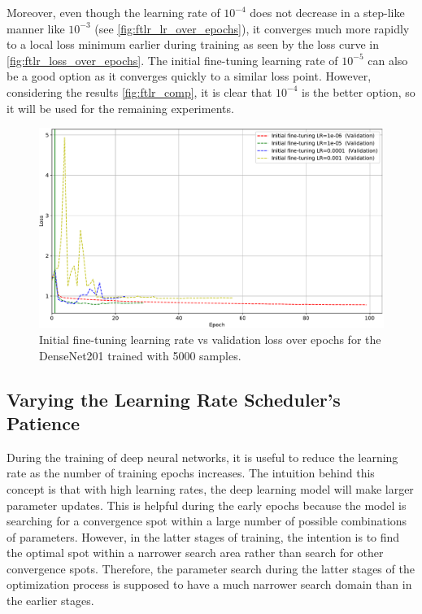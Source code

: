     Moreover, even though the learning rate of $10^{-4}$ does not decrease in a step-like manner like $10^{-3}$ (see \autoref{fig:ftlr_lr_over_epochs}), it converges much more rapidly to a local loss minimum earlier during training as seen by the loss curve in \autoref{fig:ftlr_loss_over_epochs}. The initial fine-tuning learning rate of $10^{-5}$ can also be a good option as it converges quickly to a similar loss point. However, considering the results \autoref{fig:ftlr_comp}, it is clear that $10^{-4}$ is the better option, so it will be used for the remaining experiments. \par
    
    \begin{figure}[ht]
        \centering
        \includegraphics[width=\textwidth]{figs/densenet201_ftlr_val_loss_over_epochs.pdf}
        \caption{Initial fine-tuning learning rate vs validation loss over epochs for the DenseNet201 trained with 5000 samples.}
        \label{fig:ftlr_loss_over_epochs}
    \end{figure}
    
    
    \subsection{Varying the Learning Rate Scheduler's Patience}
    During the training of deep neural networks, it is useful to reduce the learning rate as the number of training epochs increases. The intuition behind this concept is that with high learning rates, the deep learning model will make larger parameter updates. This is helpful during the early epochs because the model is searching for a convergence spot within a large number of possible combinations of parameters. However, in the latter stages of training, the intention is to find the optimal spot within a narrower search area rather than search for other convergence spots. Therefore, the parameter search during the latter stages of the optimization process is supposed to have a much narrower search domain than in the earlier stages. \par
    
